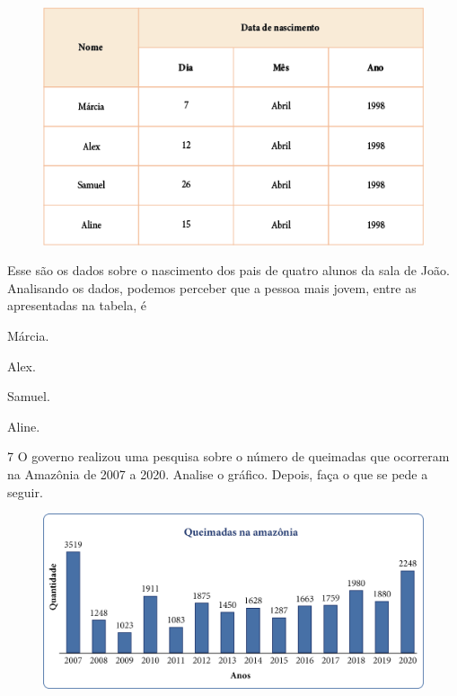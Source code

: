 \begin{figure}[htpb!]
\centering
\includegraphics[width=\textwidth]{media/image45.png}
\end{figure}

Esse são os dados sobre o nascimento dos pais de quatro alunos da sala
de João. Analisando os dados, podemos perceber que a pessoa mais jovem,
entre as apresentadas na tabela, é

\begin{escolha}
\item
  Márcia.
\item
  Alex.
\item
  Samuel.
\item
  Aline.
\end{escolha}


\pagebreak
\num{7} O governo realizou uma pesquisa sobre o número de queimadas que
ocorreram na Amazônia de 2007 a 2020. Analise o gráfico. Depois, faça o que se pede a seguir.


\begin{figure}[htpb!]
\centering
\includegraphics[width=\textwidth]{media/image46.png}
\end{figure}


